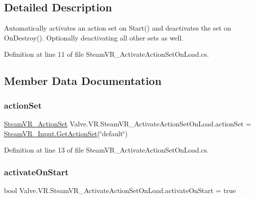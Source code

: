\subsection{Detailed Description}
Automatically activates an action set on Start() and deactivates the set on On\+Destroy(). Optionally deactivating all other sets as well. 



Definition at line 11 of file Steam\+V\+R\+\_\+\+Activate\+Action\+Set\+On\+Load.\+cs.



\subsection{Member Data Documentation}
\mbox{\label{class_valve_1_1_v_r_1_1_steam_v_r___activate_action_set_on_load_a946a5336899170149f65ac8cfbd1fb1e}} 
\subsubsection{\texorpdfstring{actionSet}{actionSet}}
{\footnotesize\ttfamily \mbox{\hyperlink{class_valve_1_1_v_r_1_1_steam_v_r___action_set}{Steam\+V\+R\+\_\+\+Action\+Set}} Valve.\+V\+R.\+Steam\+V\+R\+\_\+\+Activate\+Action\+Set\+On\+Load.\+action\+Set = \mbox{\hyperlink{class_valve_1_1_v_r_1_1_steam_v_r___input_a645e9f34de97217c31c20ba913c8d3e6}{Steam\+V\+R\+\_\+\+Input.\+Get\+Action\+Set}}(\char`\"{}default\char`\"{})}



Definition at line 13 of file Steam\+V\+R\+\_\+\+Activate\+Action\+Set\+On\+Load.\+cs.

\mbox{\label{class_valve_1_1_v_r_1_1_steam_v_r___activate_action_set_on_load_ae1337118e7ccb399cbd26e537f666e64}} 
\subsubsection{\texorpdfstring{activateOnStart}{activateOnStart}}
{\footnotesize\ttfamily bool Valve.\+V\+R.\+Steam\+V\+R\+\_\+\+Activate\+Action\+Set\+On\+Load.\+activate\+On\+Start = true}



